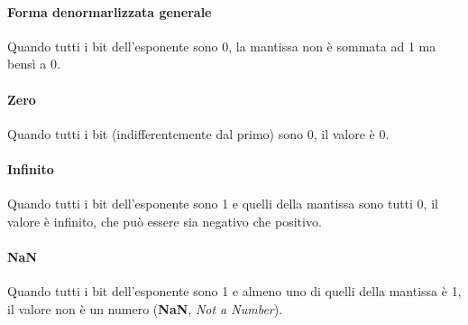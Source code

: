 \paragraph*{Forma denormarlizzata generale}
Quando tutti i bit dell'esponente sono 0, la mantissa non è sommata ad 1 ma bensì a 0.

\paragraph*{Zero}
Quando tutti i bit (indifferentemente dal primo) sono 0, il valore è 0.

\paragraph*{Infinito}
Quando tutti i bit dell'esponente sono 1 e quelli della mantissa sono tutti 0, il valore è infinito, che può essere sia negativo che positivo.

\paragraph*{NaN}
Quando tutti i bit dell'esponente sono 1 e almeno uno di quelli della mantissa è 1, il valore non è un numero (\textbf{NaN}, \emph{Not a Number}).
